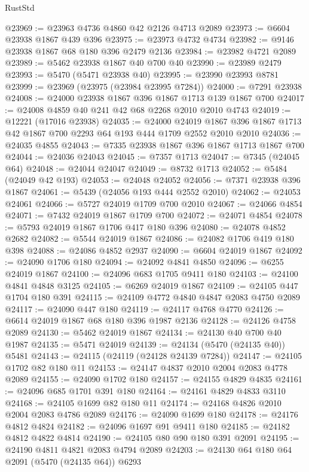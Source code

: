 \begin{lexlean}{RustStd}
\begin{coremodule}
@23969 := @23963 @4736 @4860 @42 @2126 @4713 @2089
@23973 := @6604 @23938 @1867 @439 @396
@23975 := @23973 @4732 @4734
@23982 := @9146 @23938 @1867 @68 @180 @396 @2479 @2136
@23984 := @23982 @4721 @2089
@23989 := @5462 @23938 @1867 @40 @700 @40
@23990 := @23989 @2479
@23993 := @5470 (@5471 @23938 @40)
@23995 := @23990 @23993 @8781
@23999 := @23969 (@23975 (@23984 @23995 @7284))
@24000 := @7291 @23938
@24008 := @24000 @23938 @1867 @396 @1867 @1713 @139 @1867 @700
@24017 := @24008 @4859 @40 @241 @42 @68 @2268 @2010 @2010 @4743
@24019 := @12221 (@17016 @23938)
@24035 := @24000
    @24019
    @1867
    @396
    @1867
    @1713
    @42
    @1867
    @700
    @2293
    @64
    @193
    @444
    @1709
    @2552
    @2010
    @2010
@24036 := @24035 @4855
@24043 := @7335 @23938 @1867 @396 @1867 @1713 @1867 @700
@24044 := @24036 @24043
@24045 := @7357 @1713
@24047 := @7345 (@24045 @64)
@24048 := @24044 @24047
@24049 := @8732 @1713
@24052 := @5484 (@24049 @42 @193)
@24053 := @24048 @24052
@24056 := @7371 @23938 @396 @1867
@24061 := @5439 (@24056 @193 @444 @2552 @2010)
@24062 := @24053 @24061
@24066 := @5727 @24019 @1709 @700 @2010
@24067 := @24066 @4854
@24071 := @7432 @24019 @1867 @1709 @700
@24072 := @24071 @4854
@24078 := @5793 @24019 @1867 @1706 @417 @180 @396
@24080 := @24078 @4852 @2682
@24082 := @5544 @24019 @1867
@24086 := @24082 @1706 @419 @180 @398
@24088 := @24086 @4852 @2937
@24090 := @6604 @24019 @1867
@24092 := @24090 @1706 @180
@24094 := @24092 @4841 @4850
@24096 := @6255 @24019 @1867
@24100 := @24096 @683 @1705 @9411 @180
@24103 := @24100 @4841 @4848 @3125
@24105 := @6269 @24019 @1867
@24109 := @24105 @447 @1704 @180 @391
@24115 := @24109 @4772 @4840 @4847 @2083 @4750 @2089
@24117 := @24090 @447 @180
@24119 := @24117 @4768 @4770
@24126 := @6614 @24019 @1867 @68 @180 @396 @1987 @2136
@24128 := @24126 @4758 @2089
@24130 := @5462 @24019 @1867
@24134 := @24130 @40 @700 @40 @1987
@24135 := @5471 @24019
@24139 := @24134 (@5470 (@24135 @40)) @5481
@24143 := @24115 (@24119 (@24128 @24139 @7284))
@24147 := @24105 @1702 @82 @180 @11
@24153 := @24147 @4837 @2010 @2004 @2083 @4778 @2089
@24155 := @24090 @1702 @180
@24157 := @24155 @4829 @4835
@24161 := @24096 @685 @1701 @391 @180
@24164 := @24161 @4829 @4833 @3110
@24168 := @24105 @1699 @82 @180 @11
@24174 := @24168 @4826 @2010 @2004 @2083 @4786 @2089
@24176 := @24090 @1699 @180
@24178 := @24176 @4812 @4824
@24182 := @24096 @1697 @91 @9411 @180
@24185 := @24182 @4812 @4822 @4814
@24190 := @24105 @80 @90 @180 @391 @2091
@24195 := @24190 @4811 @4821 @2083 @4794 @2089
@24203 := @24130 @64 @180 @64 @2091 (@5470 (@24135 @64)) @6293

\end{coremodule}
\end{lexlean}
